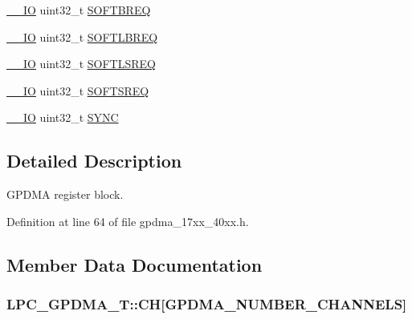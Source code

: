 \begin{DoxyCompactItemize}
\item 
\hyperlink{core__cm3_8h_aec43007d9998a0a0e01faede4133d6be}{\+\_\+\+\_\+\+IO} uint32\+\_\+t \hyperlink{structLPC__GPDMA__T_ac6bbc437741b88b7178437840f482bd7}{S\+O\+F\+T\+B\+R\+EQ}
\item 
\hyperlink{core__cm3_8h_aec43007d9998a0a0e01faede4133d6be}{\+\_\+\+\_\+\+IO} uint32\+\_\+t \hyperlink{structLPC__GPDMA__T_a565d4d2985feee1cf21acee1185373a5}{S\+O\+F\+T\+L\+B\+R\+EQ}
\item 
\hyperlink{core__cm3_8h_aec43007d9998a0a0e01faede4133d6be}{\+\_\+\+\_\+\+IO} uint32\+\_\+t \hyperlink{structLPC__GPDMA__T_a0b7a85e9f40e19d368c8358ca48778de}{S\+O\+F\+T\+L\+S\+R\+EQ}
\item 
\hyperlink{core__cm3_8h_aec43007d9998a0a0e01faede4133d6be}{\+\_\+\+\_\+\+IO} uint32\+\_\+t \hyperlink{structLPC__GPDMA__T_a2905a8988cfd38c6e44d121783c0bfe7}{S\+O\+F\+T\+S\+R\+EQ}
\item 
\hyperlink{core__cm3_8h_aec43007d9998a0a0e01faede4133d6be}{\+\_\+\+\_\+\+IO} uint32\+\_\+t \hyperlink{structLPC__GPDMA__T_ac89c20888b14781ead9fe459f8f79853}{S\+Y\+NC}
\end{DoxyCompactItemize}


\subsection{Detailed Description}
G\+P\+D\+MA register block. 

Definition at line 64 of file gpdma\+\_\+17xx\+\_\+40xx.\+h.



\subsection{Member Data Documentation}
\subsubsection[{\texorpdfstring{CH}{CH}}]{ L\+P\+C\+\_\+\+G\+P\+D\+M\+A\+\_\+\+T\+::\+CH\mbox{[}{\bf G\+P\+D\+M\+A\+\_\+\+N\+U\+M\+B\+E\+R\+\_\+\+C\+H\+A\+N\+N\+E\+LS}\mbox{]}}\hypertarget{structLPC__GPDMA__T_ab6b2ec077df490e64b10e7cb2bfeee10}{}\label{structLPC__GPDMA__T_ab6b2ec077df490e64b10e7cb2bfeee10}


